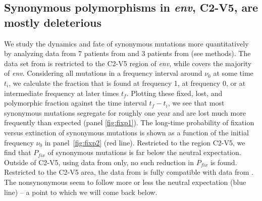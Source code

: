 \documentclass[rmp, twocolumn]{revtex4}
\newcommand{\pfix}{P_{fix}}
\newcommand{\env}{\textit{env}}
\begin{document}
\subsection{Synonymous polymorphisms in \env, C2-V5, are mostly deleterious}
We study the dynamics and fate of synonymous mutations more quantitatively by
analyzing data from 7 patients from
\citet{shankarappa_consistent_1999,liu_selection_2006} and 3 patients from
\citet{bunnik_autologous_2008} (see methods). The data set from
\citet{shankarappa_consistent_1999,liu_selection_2006} is restricted to the
C2-V5 region of \env, while \citet{bunnik_autologous_2008} covers the
majority of \env. Considering all mutations in a
frequency interval around $\nu_0$ at some time $t_i$, we calculate the fraction
that is found at frequency 1, at frequency 0, or at intermediate frequency at
later times $t_f$. Plotting these fixed, lost, and polymorphic fraction against
the time interval $t_f-t_i$, we see that most synonymous mutations segregate for
roughly one year and are lost much more frequently than expected (panel
\ref{fig:fixp1}). The long-time probability of fixation versus extinction of
synonymous mutations is shown as a function of the initial frequency $\nu_0$ in
panel~\ref{fig:fixp2} (red line). Restricted to the region C2-V5, we find that
$\pfix$ of synonymous mutations is far below the neutral expectation.
Outside of C2-V5, using data from \citet{bunnik_autologous_2008} only, no such
reduction in $\pfix$ is found. Restricted to the C2-V5 area, the data from
\citet{bunnik_autologous_2008} is fully compatible with data from
\citet{shankarappa_consistent_1999}. The nonsynonymous seem to follow more or
less the neutral expectation (blue line) -- a point to which we will come back below.
\end{document}
